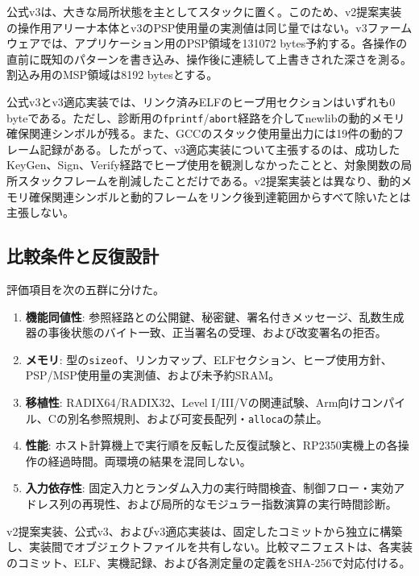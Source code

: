 \documentclass[a4paper,10pt]{ltjsarticle}
\theoremstyle{definition}
\theoremstyle{remark}
\begin{document}
公式v3は、大きな局所状態を主としてスタックに置く。このため、v2提案実装の操作用アリーナ本体とv3のPSP使用量の実測値は同じ量ではない。v3ファームウェアでは、アプリケーション用のPSP領域を\num{131072} bytes予約する。各操作の直前に既知のパターンを書き込み、操作後に連続して上書きされた深さを測る。割込み用のMSP領域は\num{8192} bytesとする。

公式v3とv3適応実装では、リンク済みELFのヒープ用セクションはいずれも0 byteである。ただし、診断用の\texttt{fprintf}/\texttt{abort}経路を介してnewlibの動的メモリ確保関連シンボルが残る。また、GCCのスタック使用量出力には19件の動的フレーム記録がある。したがって、v3適応実装について主張するのは、成功したKeyGen、Sign、Verify経路でヒープ使用を観測しなかったことと、対象関数の局所スタックフレームを削減したことだけである。v2提案実装とは異なり、動的メモリ確保関連シンボルと動的フレームをリンク後到達範囲からすべて除いたとは主張しない。

\subsection{比較条件と反復設計}
\label{sec:version-isolation}

評価項目を次の五群に分けた。

\begin{enumerate}[leftmargin=2.2em]
  \item \textbf{機能同値性}: 参照経路との公開鍵、秘密鍵、署名付きメッセージ、乱数生成器の事後状態のバイト一致、正当署名の受理、および改変署名の拒否。
  \item \textbf{メモリ}: 型の\texttt{sizeof}、リンカマップ、ELFセクション、ヒープ使用方針、PSP/MSP使用量の実測値、および未予約SRAM。
  \item \textbf{移植性}: RADIX64/RADIX32、Level I/III/Vの関連試験、Arm向けコンパイル、Cの別名参照規則、および可変長配列・\texttt{alloca}の禁止。
  \item \textbf{性能}: ホスト計算機上で実行順を反転した反復試験と、RP2350実機上の各操作の経過時間。両環境の結果を混同しない。
  \item \textbf{入力依存性}: 固定入力とランダム入力の実行時間検査、制御フロー・実効アドレス列の再現性、および局所的なモジュラー指数演算の実行時間診断。
\end{enumerate}

v2提案実装、公式v3、およびv3適応実装は、固定したコミットから独立に構築し、実装間でオブジェクトファイルを共有しない。比較マニフェストは、各実装のコミット、ELF、実機記録、および各測定量の定義をSHA-256で対応付ける。
\end{document}
